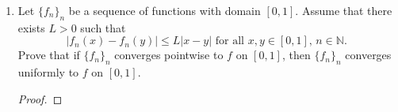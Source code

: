 \documentclass[12pt]{article}
\newenvironment{solution}
{\renewcommand\qedsymbol{$\blacksquare$}\begin{proof}[Solution]}
{\end{proof}}
\begin{document}
\begin{enumerate}
\begin{solution}
                This proves that 
                \begin{equation*}
                    f_n(x)=\frac{nx}{1+n^2x}
                \end{equation*}
                is strictly increasing over $[0, 1]$ for all $n\in\mathbb{N}$.
                It follows that for $x=1$, $f_n(x)=\sup_{x\in[0, 1]}f_n(x)$
                since $f_n$ is strictly increasing and is continuous over
                a compact interval for all $n\in\mathbb{N}$. Thus 
                \begin{equation*}
                    \lim_{n\to\infty}\sup\{f_n(x)-f\}=\lim_{n\to\infty}\frac{n}{1+n^2}=0.
                \end{equation*}
                Therefore $\{f_n\}$ converges uniformly to $f=0$. Now we note
                that since $g(x)$ is continuous over $[0, 1]\subset\mathbb{R}$,
                then $g$ is bounded by some $M\in\mathbb{R}$. Thus 
                \begin{align*}
                    \bigg|\lim_{n\to\infty}\int_{0}^{1}\frac{nxg(x)}{1+n^2x}dx\bigg|&\leq
                    \bigg|\lim_{n\to\infty}\int_{0}^{1}\frac{nxM}{1+n^2x}dx\bigg|
                    \\
                    &=\bigg|M\int_{0}^{1}\lim_{n\to\infty}\frac{nx}{1+n^2x}dx\bigg| \\
                    &=\bigg|M\int_{0}^{1}0dx\bigg| \\
                    &=0.
                \end{align*}
                Therefore 
                \begin{equation*}
                    \lim_{n\to\infty}\int_{0}^{1}\frac{nxg(x)}{1+n^2x}dx=0.
                \end{equation*}
            \end{solution}
        \item Let $\{f_n\}_n$ be a sequence of functions with domain $[0, 1]$.
            Assume that there exists $L>0$ such that 
            \begin{equation*}
                |f_n(x)-f_n(y)|\leq L|x-y|\text{ for all $x, y\in[0, 1]$,
                $n\in\mathbb{N}$. }
            \end{equation*}
            Prove that if $\{f_n\}_n$ converges pointwise to $f$ on $[0, 1]$,
            then $\{f_n\}_n$ converges uniformly to $f$ on $[0, 1]$. 
            \begin{proof}
                
            \end{proof}
    \end{enumerate}
\end{document}
